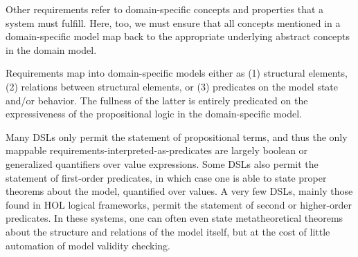 \documentclass[10pt,letterpaper]{article}
\begin{document}
Other requirements refer to domain-specific concepts and properties that a system must fulfill. Here, too, we must ensure that all concepts mentioned in a domain-specific model map back to the appropriate underlying abstract concepts in the domain model.

Requirements map into domain-specific models either as (1) structural elements, (2) relations between structural elements, or (3) predicates on the model state and/or behavior. The fullness of the latter is entirely predicated on the expressiveness of the propositional logic in the domain-specific model.

Many DSLs only permit the statement of propositional terms, and thus the only mappable requirements-interpreted-as-predicates are largely boolean or generalized quantifiers over value expressions. Some DSLs also permit the statement of first-order predicates, in which case one is able to state proper theorems about the model, quantified over values. A very few DSLs, mainly those found in HOL logical frameworks, permit the statement of second or higher-order predicates. In these systems, one can often even state metatheoretical theorems about the structure and relations of the model itself, but at the cost of little automation of model validity checking.

\printbibliography[heading=bibintoc]
\end{document}
